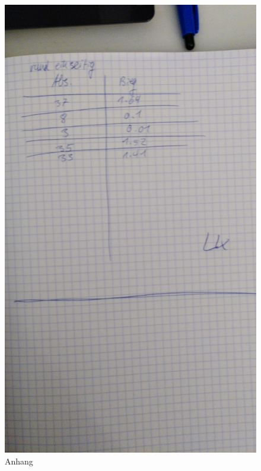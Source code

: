 \begin{figure}
    \centering
    \includegraphics[scale=0.8]{an3.jpeg}
    \caption{Anhang}
    \label{fig:fick}
\end{figure}